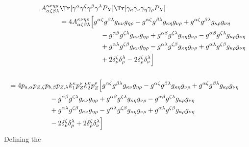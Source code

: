 \begin{align}
	\begin{split}
		A_{\alpha\zeta\beta\lambda}^{\kappa\nu\eta\rho}&
		\Tr[\gamma^\alpha\gamma^\zeta\gamma^\beta\gamma^\lambda P_{X}]
		\Tr[\gamma_\kappa\gamma_\nu\gamma_\eta\gamma_\rho P_{X}]
		\\
		&=4A_{\alpha\zeta\beta\lambda}^{\kappa\nu\eta\rho}
		\Big[
			g^{\alpha\zeta}g^{\beta\lambda}g_{\kappa\nu}g_{\eta\rho}
			-g^{\alpha\zeta}g^{\beta\lambda}g_{\kappa\eta}g_{\nu\rho}
			+g^{\alpha\zeta}g^{\beta\lambda}g_{\kappa\rho}g_{\nu\eta}
			\\
			&\qquad\qquad\qquad
			-g^{\alpha\beta}g^{\zeta\lambda}g_{\kappa\nu}g_{\eta\rho}
			+g^{\alpha\beta}g^{\zeta\lambda}g_{\kappa\eta}g_{\nu\rho}
			-g^{\alpha\beta}g^{\zeta\lambda}g_{\kappa\rho}g_{\nu\eta}
			\\
			&\qquad\qquad\qquad
			+g^{\alpha\lambda}g^{\zeta\beta}g_{\kappa\nu}g_{\eta\rho}
			-g^{\alpha\lambda}g^{\zeta\beta}g_{\kappa\eta}g_{\nu\rho}
			+g^{\alpha\lambda}g^{\zeta\beta}g_{\kappa\rho}g_{\nu\eta}
			\\
			&\qquad\qquad\qquad
			+2\delta^\zeta_\nu\delta^\lambda_\rho
			-2\delta^\zeta_\rho\delta^\lambda_\nu
		\Big]
	\end{split}
	\\
	\begin{split}
		\\
		&=4
		p_{a,\alpha}p_{Z,\zeta}p_{b,\beta}p_{Z,\lambda}
		k_1^{\kappa}p_Z^{\nu}k_2^{\eta}p_Z^{\rho}
		\Big[
			g^{\alpha\zeta}g^{\beta\lambda}g_{\kappa\nu}g_{\eta\rho}
			-g^{\alpha\zeta}g^{\beta\lambda}g_{\kappa\eta}g_{\nu\rho}
			+g^{\alpha\zeta}g^{\beta\lambda}g_{\kappa\rho}g_{\nu\eta}
			\\
			&\qquad\qquad\qquad
			-g^{\alpha\beta}g^{\zeta\lambda}g_{\kappa\nu}g_{\eta\rho}
			+g^{\alpha\beta}g^{\zeta\lambda}g_{\kappa\eta}g_{\nu\rho}
			-g^{\alpha\beta}g^{\zeta\lambda}g_{\kappa\rho}g_{\nu\eta}
			\\
			&\qquad\qquad\qquad
			+g^{\alpha\lambda}g^{\zeta\beta}g_{\kappa\nu}g_{\eta\rho}
			-g^{\alpha\lambda}g^{\zeta\beta}g_{\kappa\eta}g_{\nu\rho}
			+g^{\alpha\lambda}g^{\zeta\beta}g_{\kappa\rho}g_{\nu\eta}
			\\
			&\qquad\qquad\qquad
			-2\delta^\zeta_\nu\delta^\lambda_\rho
			+2\delta^\zeta_\rho\delta^\lambda_\nu
		\Big]
	\end{split}
\end{align}
Defining the 
